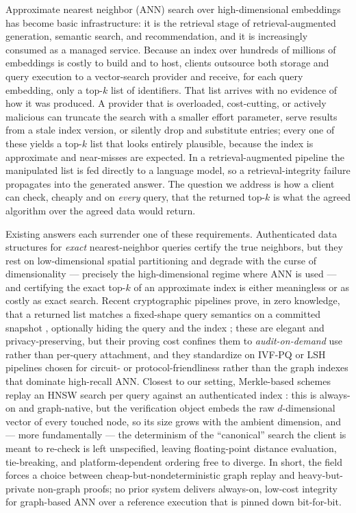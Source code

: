 \documentclass[11pt]{article}
\begin{document}
Approximate nearest neighbor (ANN) search over high-dimensional
embeddings has become basic infrastructure: it is the retrieval stage of
retrieval-augmented generation, semantic search, and recommendation, and
it is increasingly consumed as a managed service. Because an index over
hundreds of millions of embeddings is costly to build and to host,
clients outsource both storage and query execution to a vector-search
provider and receive, for each query embedding, only a top-$k$ list of
identifiers. That list arrives with no evidence of how it was produced.
A provider that is overloaded, cost-cutting, or actively malicious can
truncate the search with a smaller effort parameter, serve results from
a stale index version, or silently drop and substitute entries; every
one of these yields a top-$k$ list that looks entirely plausible,
because the index is approximate and near-misses are expected. In a
retrieval-augmented pipeline the manipulated list is fed directly to a
language model, so a retrieval-integrity failure propagates into the
generated answer. The question we address is how a client can check,
cheaply and on \emph{every} query, that the returned top-$k$ is what the
agreed algorithm over the agreed data would return.

Existing answers each surrender one of these requirements. Authenticated
data structures for \emph{exact} nearest-neighbor queries
\cite{papadopoulos2011} certify the true neighbors, but they rest on
low-dimensional spatial partitioning and degrade with the curse of
dimensionality --- precisely the high-dimensional regime where ANN is
used --- and certifying the exact top-$k$ of an approximate index is
either meaningless or as costly as exact search. Recent cryptographic
pipelines prove, in zero knowledge, that a returned list matches a
fixed-shape query semantics on a committed snapshot \cite{v3db2026},
optionally hiding the query and the index \cite{veriann2026}; these are
elegant and privacy-preserving, but their proving cost confines them to
\emph{audit-on-demand} use rather than per-query attachment, and they
standardize on IVF-PQ or LSH pipelines chosen for circuit- or
protocol-friendliness rather than the graph indexes that dominate
high-recall ANN. Closest to our setting, Merkle-based schemes replay an
HNSW \cite{malkov2018hnsw} search per query against an authenticated
index \cite{annproof2024,vis2024}: this is always-on and graph-native,
but the verification object embeds the raw $d$-dimensional vector of
every touched node, so its size grows with the ambient dimension, and
--- more fundamentally --- the determinism of the ``canonical'' search
the client is meant to re-check is left unspecified, leaving
floating-point distance evaluation, tie-breaking, and platform-dependent
ordering free to diverge. In short, the field forces a choice between
cheap-but-nondeterministic graph replay and heavy-but-private non-graph
proofs; no prior system delivers always-on, low-cost integrity for
graph-based ANN over a reference execution that is pinned down
bit-for-bit.
\end{document}
